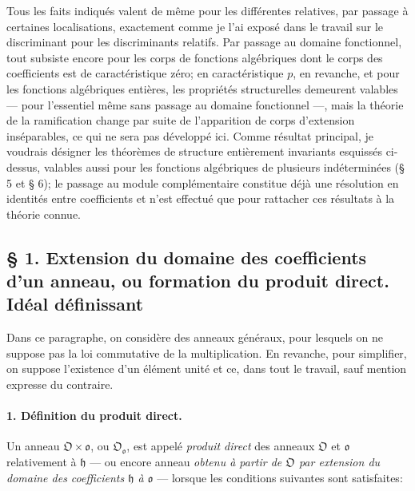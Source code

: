 Tous les faits indiqués valent de même pour les différentes relatives, par passage à certaines localisations, exactement comme je l'ai exposé dans le travail sur le discriminant pour les discriminants relatifs. Par passage au domaine fonctionnel, tout subsiste encore pour les corps de fonctions algébriques dont le corps des coefficients est de caractéristique zéro; en caractéristique \(p\), en revanche, et pour les fonctions algébriques entières, les propriétés structurelles demeurent valables --- pour l'essentiel même sans passage au domaine fonctionnel ---, mais la théorie de la ramification change par suite de l'apparition de corps d'extension inséparables, ce qui ne sera pas développé ici. Comme résultat principal, je voudrais désigner les théorèmes de structure entièrement invariants esquissés ci-dessus, valables aussi pour les fonctions algébriques de plusieurs indéterminées (\S{} 5 et \S{} 6); le passage au module complémentaire constitue déjà une résolution en identités entre coefficients et n'est effectué que pour rattacher ces résultats à la théorie connue.

\subsection*{\S{} 1. Extension du domaine des coefficients d'un anneau, ou formation du produit direct. Idéal définissant}

Dans ce paragraphe, on considère des anneaux généraux, pour lesquels on ne suppose pas la loi commutative de la multiplication. En revanche, pour simplifier, on suppose l'existence d'un élément unité et ce, dans tout le travail, sauf mention expresse du contraire.

\paragraph{1. Définition du produit direct.}
Un anneau \(\mathfrak O\times\mathfrak o\), ou \(\mathfrak O_{\mathfrak o}\), est appelé \emph{produit direct} des anneaux \(\mathfrak O\) et \(\mathfrak o\) relativement à \(\mathfrak h\) --- ou encore anneau \emph{obtenu à partir de \(\mathfrak O\) par extension du domaine des coefficients \(\mathfrak h\) à \(\mathfrak o\)} --- lorsque les conditions suivantes sont satisfaites:

